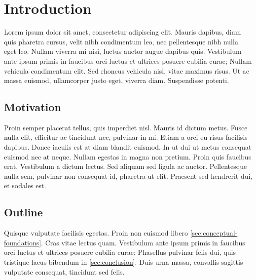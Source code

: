 %
\section{Introduction}
\label{sec:introduction}
%

Lorem ipsum dolor sit amet, consectetur adipiscing elit. Mauris dapibus, diam quis pharetra cursus, velit nibh condimentum leo, nec pellentesque nibh nulla eget leo. Nullam viverra mi nisi, luctus auctor augue dapibus quis. Vestibulum ante ipsum primis in faucibus orci luctus et ultrices posuere cubilia curae; Nullam vehicula condimentum elit. Sed rhoncus vehicula nisl, vitae maximus risus. Ut ac massa euismod, ullamcorper justo eget, viverra diam. Suspendisse potenti.

%
\subsection{Motivation}
\label{subsec:motivation}
%

Proin semper placerat tellus, quis imperdiet nisl. Mauris id dictum metus. Fusce nulla elit, efficitur ac tincidunt nec, pulvinar in mi. Etiam a orci eu risus facilisis dapibus. Donec iaculis est at diam blandit euismod. In ut dui ut metus consequat euismod nec at neque. Nullam egestas in magna non pretium. Proin quis faucibus erat. Vestibulum a dictum lectus. Sed aliquam sed ligula ac auctor. Pellentesque nulla sem, pulvinar non consequat id, pharetra ut elit. Praesent sed hendrerit dui, et sodales est.

%
\subsection{Outline}
\label{subsec:outline}
%

Quisque vulputate facilisis egestas. Proin non euismod libero \ref{sec:conceptual-foundations}. Cras vitae lectus quam. Vestibulum ante ipsum primis in faucibus orci luctus et ultrices posuere cubilia curae; Phasellus pulvinar felis dui, quis tristique lacus bibendum in \ref{sec:conclusion}. Duis urna massa, convallis sagittis vulputate consequat, tincidunt sed felis.
